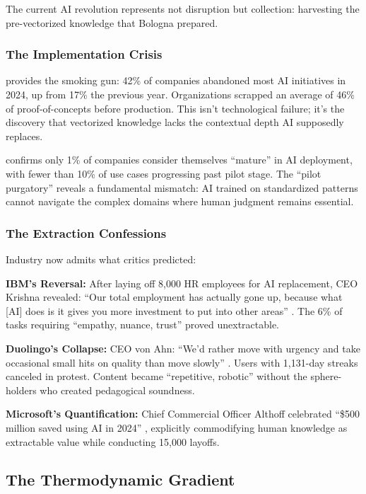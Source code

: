The current AI revolution represents not disruption but collection: harvesting the pre-vectorized knowledge that Bologna prepared.

\subsubsection{The Implementation Crisis}

\citet{spglobal2025} provides the smoking gun: 42\% of companies abandoned most AI initiatives in 2024, up from 17\% the previous year. Organizations scrapped an average of 46\% of proof-of-concepts before production. This isn't technological failure; it's the discovery that vectorized knowledge lacks the contextual depth AI supposedly replaces.

\citet{mckinsey2025} confirms only 1\% of companies consider themselves ``mature'' in AI deployment, with fewer than 10\% of use cases progressing past pilot stage. The ``pilot purgatory'' reveals a fundamental mismatch: AI trained on standardized patterns cannot navigate the complex domains where human judgment remains essential.

\subsubsection{The Extraction Confessions}

Industry now admits what critics predicted:

\textbf{IBM's Reversal:} After laying off 8,000 HR employees for AI replacement, CEO Krishna revealed: ``Our total employment has actually gone up, because what [AI] does is it gives you more investment to put into other areas'' \citep{krishna2024}. The 6\% of tasks requiring ``empathy, nuance, trust'' proved unextractable.

\textbf{Duolingo's Collapse:} CEO von Ahn: ``We'd rather move with urgency and take occasional small hits on quality than move slowly'' \citep{vonahn2024}. Users with 1,131-day streaks canceled in protest. Content became ``repetitive, robotic'' without the sphere-holders who created pedagogical soundness.

\textbf{Microsoft's Quantification:} Chief Commercial Officer Althoff celebrated ``\$500 million saved using AI in 2024'' \citep{althoff2024}, explicitly commodifying human knowledge as extractable value while conducting 15,000 layoffs.

\subsection{The Thermodynamic Gradient}

